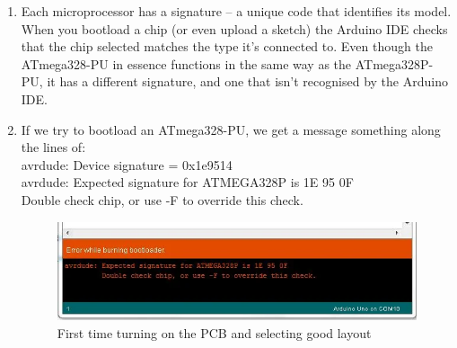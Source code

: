 \documentclass[a4paper,11pt]{article}%
\begin{document}
\begin{enumerate}
	\item Each microprocessor has a signature – a unique code that identifies its model. When you bootload a chip (or even upload a sketch) the Arduino IDE checks that the chip selected matches the type it’s connected to. Even though the ATmega328-PU in essence functions in the same way as the ATmega328P-PU, it has a different signature, and one that isn’t recognised by the Arduino IDE.
	\item If we try to bootload an ATmega328-PU, we get a message something along the lines of:\\
	      avrdude: Device signature = 0x1e9514\\
	      avrdude: Expected signature for ATMEGA328P is 1E 95 0F\\
	      Double check chip, or use -F to override this check.\\
	      \begin{figure}[H]
		      \centering
		      \includegraphics[scale=0.6]{figures/bootload_error.png}
		      \caption{First time turning on the PCB and selecting good layout}
	      \end{figure}


\end{enumerate}
\end{document}
